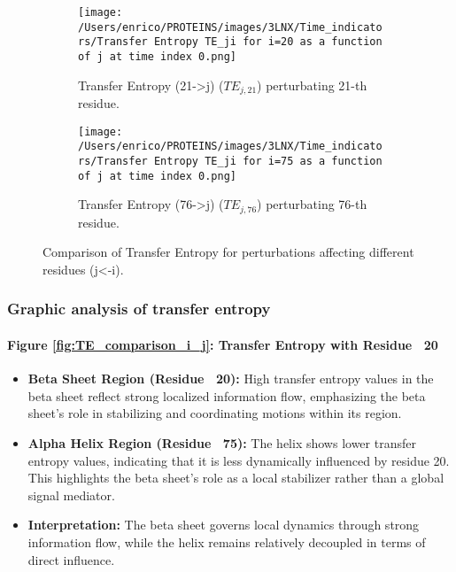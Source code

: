 \documentclass[English, Lau, oneside]{sapthesis}
\begin{document}
\begin{figure}[h!]
    \centering
    \begin{subfigure}[t]{0.48\textwidth}
        \centering
        \texttt{[image: /Users/enrico/PROTEINS/images/3LNX/Time\_indicators/Transfer Entropy TE\_ji for i=20 as a function of j at time index 0.png]}
        \caption{Transfer Entropy (21->j) ($TE_{j,21}$) perturbating 21-th residue.}
        \label{fig:TE21_j_i}
    \end{subfigure}
    \hfill
    \begin{subfigure}[t]{0.48\textwidth}
        \centering
        \texttt{[image: /Users/enrico/PROTEINS/images/3LNX/Time\_indicators/Transfer Entropy TE\_ji for i=75 as a function of j at time index 0.png]}
        \caption{Transfer Entropy (76->j) ($TE_{j,76}$) perturbating 76-th residue.}
        \label{fig:TE76_j_i}
    \end{subfigure}
    \caption{Comparison of Transfer Entropy for perturbations affecting different residues (j<-i).}
    \label{fig:TE_comparison_j_i}
\end{figure}


\subsubsection{Graphic analysis of transfer entropy}
\paragraph{Figure \ref{fig:TE_comparison_i_j}: Transfer Entropy with Residue ~20}
\begin{itemize}
    \item \textbf{Beta Sheet Region (Residue ~20):} High transfer entropy values in the beta sheet reflect strong localized information flow, emphasizing the beta sheet's role in stabilizing and coordinating motions within its region.
    \item \textbf{Alpha Helix Region (Residue ~75):} The helix shows lower transfer entropy values, indicating that it is less dynamically influenced by residue 20. This highlights the beta sheet's role as a local stabilizer rather than a global signal mediator.
    \item \textbf{Interpretation:} The beta sheet governs local dynamics through strong information flow, while the helix remains relatively decoupled in terms of direct influence.
\end{itemize}
\end{document}
